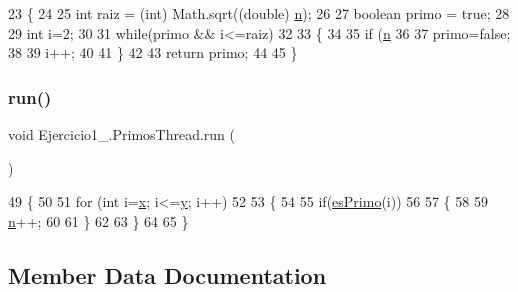 \begin{DoxyCode}
23                                   \{
24 
25         \textcolor{keywordtype}{int} raiz = (int) Math.sqrt((\textcolor{keywordtype}{double}) \mbox{\hyperlink{class_ejercicio1__2_1_1_primos_thread_a72bf483238391becf2581e3722acd93a}{n}});
26 
27         \textcolor{keywordtype}{boolean} primo = \textcolor{keyword}{true};
28 
29         \textcolor{keywordtype}{int} i=2;
30 
31         \textcolor{keywordflow}{while}(primo && i<=raiz)
32 
33         \{
34 
35             \textcolor{keywordflow}{if} (\mbox{\hyperlink{class_ejercicio1__2_1_1_primos_thread_a72bf483238391becf2581e3722acd93a}{n}} %
36 
37                 primo=\textcolor{keyword}{false};
38 
39             i++;
40 
41         \}
42 
43         \textcolor{keywordflow}{return} primo;
44 
45     \}
\end{DoxyCode}
\mbox{\label{class_ejercicio1__2_1_1_primos_thread_ac7e117a957090bac9ba6d12bf3aca923}} 
\subsubsection{\texorpdfstring{run()}{run()}}
{\footnotesize\ttfamily void Ejercicio1\+\_.\+Primos\+Thread.\+run (\begin{DoxyParamCaption}{ }\end{DoxyParamCaption})\hspace{0.3cm}{\ttfamily [inline]}}


\begin{DoxyCode}
49                      \{
50 
51         \textcolor{keywordflow}{for} (\textcolor{keywordtype}{int} i=\mbox{\hyperlink{class_ejercicio1__2_1_1_primos_thread_a872cf888fbe168d9ca57e2b9ca075b61}{x}}; i<=\mbox{\hyperlink{class_ejercicio1__2_1_1_primos_thread_af052942d1162ca124373cee5f99c7dad}{y}}; i++)
52 
53         \{
54 
55             \textcolor{keywordflow}{if}(\mbox{\hyperlink{class_ejercicio1__2_1_1_primos_thread_a2485938f2bd75c8f24b2e7156d50fa1b}{esPrimo}}(i))
56 
57             \{
58 
59                 \mbox{\hyperlink{class_ejercicio1__2_1_1_primos_thread_a72bf483238391becf2581e3722acd93a}{n}}++;
60 
61             \}
62 
63         \}
64 
65     \}
\end{DoxyCode}


\subsection{Member Data Documentation}
\mbox{\label{class_ejercicio1__2_1_1_primos_thread_a72bf483238391becf2581e3722acd93a}} 

